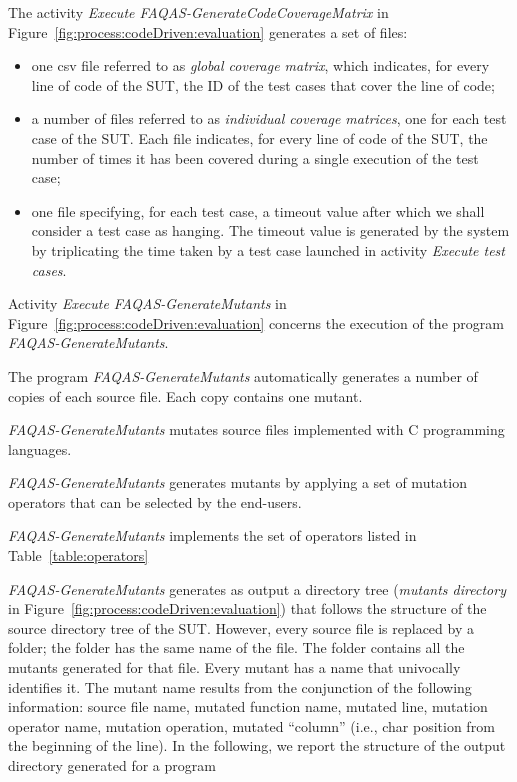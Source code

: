 The activity \emph{Execute FAQAS-GenerateCodeCoverageMatrix} in Figure~\ref{fig:process:codeDriven:evaluation} generates a set of files: 
\begin{itemize}
\item one csv file referred to as \emph{global coverage matrix}, which indicates, for every line of code of the SUT, the ID of the test cases that cover the line of code;
\item a number of files  referred to as \emph{individual coverage matrices}, one for each test case of the SUT. Each file indicates, for every line of code of the SUT, the number of times it has been covered during a single execution of the test case;
\item one file specifying, for each test case, a timeout value after which we shall consider a test case as hanging. The timeout value is generated by the system by triplicating the time taken by a test case launched in activity \emph{Execute test cases}.
\end{itemize}

Activity \emph{Execute FAQAS-GenerateMutants} in Figure~\ref{fig:process:codeDriven:evaluation} concerns the execution of the program \emph{FAQAS-GenerateMutants}. 

The program \emph{FAQAS-GenerateMutants} automatically generates a number of copies of each source file. Each copy contains one mutant.

\emph{FAQAS-GenerateMutants} mutates source files implemented with C programming languages.

\emph{FAQAS-GenerateMutants} generates mutants by applying a set of mutation operators that can be selected by the end-users.

\emph{FAQAS-GenerateMutants} implements the set of operators listed in Table~\ref{table:operators}



\emph{FAQAS-GenerateMutants} generates as output a directory tree (\emph{mutants directory} in Figure~\ref{fig:process:codeDriven:evaluation}) that follows the structure of the source directory tree of the SUT. However, every source file is replaced by a folder; the folder has the same name of the file. The folder contains all the mutants generated for that file. Every mutant has a name that univocally identifies it. The mutant name results from the conjunction of the following information:
source file name, mutated function name, mutated line, mutation operator name, mutation operation, mutated ``column'' (i.e., char position from the beginning of the line).
In the following, we report the structure of the output directory generated for a program


